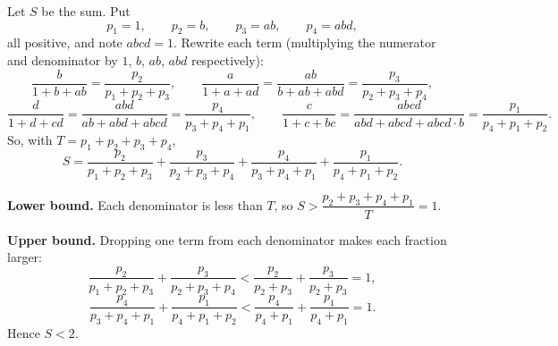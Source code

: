 Let $S$ be the sum. Put
\[p_1=1,\qquad p_2=b,\qquad p_3=ab,\qquad p_4=abd,\]
all positive, and note $abcd=1$. Rewrite each term (multiplying the numerator and denominator by $1$, $b$, $ab$, $abd$ respectively):
\[\dfrac{b}{1+b+ab}=\dfrac{p_2}{p_1+p_2+p_3},\qquad \dfrac{a}{1+a+ad}=\dfrac{ab}{b+ab+abd}=\dfrac{p_3}{p_2+p_3+p_4},\]
\[\dfrac{d}{1+d+cd}=\dfrac{abd}{ab+abd+abcd}=\dfrac{p_4}{p_3+p_4+p_1},\qquad \dfrac{c}{1+c+bc}=\dfrac{abcd}{abd+abcd+abcd\cdot b}=\dfrac{p_1}{p_4+p_1+p_2}.\]
So, with $T=p_1+p_2+p_3+p_4$,
\[S=\dfrac{p_2}{p_1+p_2+p_3}+\dfrac{p_3}{p_2+p_3+p_4}+\dfrac{p_4}{p_3+p_4+p_1}+\dfrac{p_1}{p_4+p_1+p_2}.\]

\textbf{Lower bound.} Each denominator is less than $T$, so $S>\dfrac{p_2+p_3+p_4+p_1}{T}=1$.

\textbf{Upper bound.} Dropping one term from each denominator makes each fraction larger:
\[\dfrac{p_2}{p_1+p_2+p_3}+\dfrac{p_3}{p_2+p_3+p_4}<\dfrac{p_2}{p_2+p_3}+\dfrac{p_3}{p_2+p_3}=1,\]
\[\dfrac{p_4}{p_3+p_4+p_1}+\dfrac{p_1}{p_4+p_1+p_2}<\dfrac{p_4}{p_4+p_1}+\dfrac{p_1}{p_4+p_1}=1.\]
Hence $S<2$.
